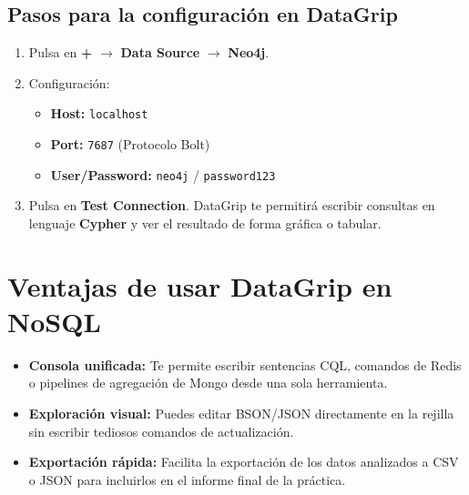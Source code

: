 \documentclass[12pt,a4paper]{article}
\begin{document}
\subsection{Pasos para la configuración en DataGrip}
\begin{enumerate}
    \item Pulsa en \textbf{+} $\rightarrow$ \textbf{Data Source} $\rightarrow$ \textbf{Neo4j}.
    \item Configuración:
    \begin{itemize}
        \item \textbf{Host:} \texttt{localhost}
        \item \textbf{Port:} \texttt{7687} (Protocolo Bolt)
        \item \textbf{User/Password:} \texttt{neo4j} / \texttt{password123}
    \end{itemize}
    \item Pulsa en \textbf{Test Connection}. DataGrip te permitirá escribir consultas en lenguaje \textbf{Cypher} y ver el resultado de forma gráfica o tabular.
\end{enumerate}

\section{Ventajas de usar DataGrip en NoSQL}
\begin{itemize}
    \item \textbf{Consola unificada:} Te permite escribir sentencias CQL, comandos de Redis o pipelines de agregación de Mongo desde una sola herramienta.
    \item \textbf{Exploración visual:} Puedes editar BSON/JSON directamente en la rejilla sin escribir tediosos comandos de actualización.
    \item \textbf{Exportación rápida:} Facilita la exportación de los datos analizados a CSV o JSON para incluirlos en el informe final de la práctica.
\end{itemize}
\end{document}
